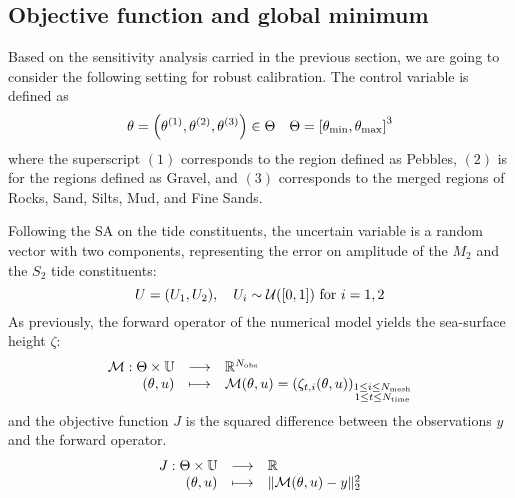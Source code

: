 \documentclass[../../Main_ManuscritThese.tex]{subfiles}
\newcommand{\zob}{z_b}
\begin{document}
\subsection{Objective function and global minimum}
\label{ssec:glob_mini}
Based on the sensitivity analysis carried in the previous section, we
are going to consider the following setting for robust calibration.
The control variable is defined as
\begin{equation}
  \kk=\left(\kk^{(1)},\kk^{(2)},\kk^{(3)}\right) \in \Kspace %
  \quad \Kspace = \interval{\kk_{\min}}{\kk_{\max}}^3
\end{equation}
 where the superscript $(1)$ corresponds to the region
defined as Pebbles, $(2)$ is for the regions defined as Gravel, and
$(3)$ corresponds to the merged regions of Rocks, Sand, Silts, Mud,
and Fine Sands.



Following the SA on the tide constituents, the uncertain variable is a
random vector with two components, representing the error on
amplitude of the $M_2$ and the $S_2$ tide constituents:
\begin{equation}
  \UU = (\UU_1,\UU_2), \quad \UU_i \sim \mathcal{U}(\interval{0}{1}) \text{ for } i=1,2
\end{equation}
As previously, the forward operator of the numerical model yields the
sea-surface height $\zeta$:
\begin{equation}
  \begin{array}{rcl}
    \mathcal{M}: \Theta \times \mathbb{U} &\longrightarrow& \mathbb{R}^{N_{\mathrm{obs}}} \\
    (\theta, u)& \longmapsto & \mathcal{M}(\theta, u) = \left(\zeta_{t,i}(\theta, u)\right)_{\substack{1 \leq i \leq N_{\mathrm{mesh}} \\ 1 \leq t \leq N_{\mathrm{time}}}} \\ 
  \end{array}
\end{equation}
and the objective function $J$ is the squared difference between the
observations $y$ and the forward operator.
\begin{equation}
  \begin{array}{rcl}
    J: \Theta \times \mathbb{U} & \longrightarrow & \mathbb{R} \\
    (\theta, u) & \longmapsto & \|\mathcal{M}(\theta, u) - y \|^2_2
  \end{array}
\end{equation}
\end{document}
